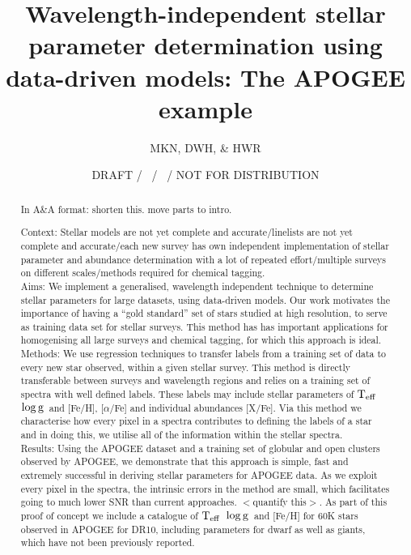 \documentclass[12pt, preprint]{aastex}
\newcommand{\teff}{\mbox{$\rm T_{eff}$}}
\newcommand{\logg}{\mbox{$\rm \log g$}}
\begin{document}
\title{Wavelength-independent stellar parameter determination using data-driven models: The APOGEE example}
\author{
  MKN,
  DWH,
  \&
  HWR}
\date{DRAFT / \gitdate\ / \githash\ / NOT FOR DISTRIBUTION}


\begin{abstract}
In A\&A format: shorten this. move parts to intro.

Context: Stellar models are not yet complete and accurate/linelists are not yet complete and accurate/each new survey has own independent implementation of stellar parameter and abundance determination with a lot of repeated effort/multiple surveys on different scales/methods required for chemical tagging.\\
Aims: We implement a generalised, wavelength independent technique to determine stellar parameters for large datasets, using data-driven models. Our work motivates the importance of having a ``gold standard'' set of stars studied at high resolution, to serve as training data set for stellar surveys. This method has has important applications for homogenising all large surveys and chemical tagging, for which this approach is ideal. \\ %
%
Methods: We use regression techniques to transfer labels from a training set of data to every new star observed, within a given stellar survey. This method is directly transferable between surveys and wavelength regions and relies on a training set of spectra with well defined labels. These labels may include stellar parameters of \teff\, \logg\ and [Fe/H], [$\alpha$/Fe] and individual abundances [X/Fe]. Via this method we characterise how every pixel in a spectra contributes to defining the labels of a star and in doing this, we utilise all of the information within the stellar spectra. \\
Results:  Using the APOGEE dataset and a training set of globular and open clusters observed by APOGEE, we demonstrate that this approach is simple, fast and extremely successful in deriving stellar parameters for APOGEE data. As we exploit every pixel in the spectra, the intrinsic errors in the method are small, which facilitates going to much lower SNR than current approaches. $< $quantify this$>$. As part of this proof of concept we include a catalogue of \teff\, \logg\ and [Fe/H] for 60K stars observed in APOGEE for DR10, including parameters for dwarf as well as giants, which have not been previously reported. \\

\end{abstract}
\end{document}

